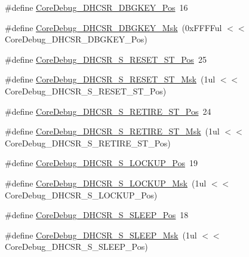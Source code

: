 \begin{DoxyCompactItemize}
\item 
\#define \hyperlink{group___c_m_s_i_s___c_m3___core_debug_gac91280edd0ce932665cf75a23d11d842}{Core\+Debug\+\_\+\+D\+H\+C\+S\+R\+\_\+\+D\+B\+G\+K\+E\+Y\+\_\+\+Pos}~16
\item 
\#define \hyperlink{group___c_m_s_i_s___c_m3___core_debug_ga1ce997cee15edaafe4aed77751816ffc}{Core\+Debug\+\_\+\+D\+H\+C\+S\+R\+\_\+\+D\+B\+G\+K\+E\+Y\+\_\+\+Msk}~(0x\+F\+F\+F\+Ful $<$$<$ Core\+Debug\+\_\+\+D\+H\+C\+S\+R\+\_\+\+D\+B\+G\+K\+E\+Y\+\_\+\+Pos)
\item 
\#define \hyperlink{group___c_m_s_i_s___c_m3___core_debug_ga6f934c5427ea057394268e541fa97753}{Core\+Debug\+\_\+\+D\+H\+C\+S\+R\+\_\+\+S\+\_\+\+R\+E\+S\+E\+T\+\_\+\+S\+T\+\_\+\+Pos}~25
\item 
\#define \hyperlink{group___c_m_s_i_s___c_m3___core_debug_gac474394bcceb31a8e09566c90b3f8922}{Core\+Debug\+\_\+\+D\+H\+C\+S\+R\+\_\+\+S\+\_\+\+R\+E\+S\+E\+T\+\_\+\+S\+T\+\_\+\+Msk}~(1ul $<$$<$ Core\+Debug\+\_\+\+D\+H\+C\+S\+R\+\_\+\+S\+\_\+\+R\+E\+S\+E\+T\+\_\+\+S\+T\+\_\+\+Pos)
\item 
\#define \hyperlink{group___c_m_s_i_s___c_m3___core_debug_ga2328118f8b3574c871a53605eb17e730}{Core\+Debug\+\_\+\+D\+H\+C\+S\+R\+\_\+\+S\+\_\+\+R\+E\+T\+I\+R\+E\+\_\+\+S\+T\+\_\+\+Pos}~24
\item 
\#define \hyperlink{group___c_m_s_i_s___c_m3___core_debug_ga89dceb5325f6bcb36a0473d65fbfcfa6}{Core\+Debug\+\_\+\+D\+H\+C\+S\+R\+\_\+\+S\+\_\+\+R\+E\+T\+I\+R\+E\+\_\+\+S\+T\+\_\+\+Msk}~(1ul $<$$<$ Core\+Debug\+\_\+\+D\+H\+C\+S\+R\+\_\+\+S\+\_\+\+R\+E\+T\+I\+R\+E\+\_\+\+S\+T\+\_\+\+Pos)
\item 
\#define \hyperlink{group___c_m_s_i_s___c_m3___core_debug_ga2900dd56a988a4ed27ad664d5642807e}{Core\+Debug\+\_\+\+D\+H\+C\+S\+R\+\_\+\+S\+\_\+\+L\+O\+C\+K\+U\+P\+\_\+\+Pos}~19
\item 
\#define \hyperlink{group___c_m_s_i_s___c_m3___core_debug_ga7b67e4506d7f464ef5dafd6219739756}{Core\+Debug\+\_\+\+D\+H\+C\+S\+R\+\_\+\+S\+\_\+\+L\+O\+C\+K\+U\+P\+\_\+\+Msk}~(1ul $<$$<$ Core\+Debug\+\_\+\+D\+H\+C\+S\+R\+\_\+\+S\+\_\+\+L\+O\+C\+K\+U\+P\+\_\+\+Pos)
\item 
\#define \hyperlink{group___c_m_s_i_s___c_m3___core_debug_ga349ccea33accc705595624c2d334fbcb}{Core\+Debug\+\_\+\+D\+H\+C\+S\+R\+\_\+\+S\+\_\+\+S\+L\+E\+E\+P\+\_\+\+Pos}~18
\item 
\#define \hyperlink{group___c_m_s_i_s___c_m3___core_debug_ga98d51538e645c2c1a422279cd85a0a25}{Core\+Debug\+\_\+\+D\+H\+C\+S\+R\+\_\+\+S\+\_\+\+S\+L\+E\+E\+P\+\_\+\+Msk}~(1ul $<$$<$ Core\+Debug\+\_\+\+D\+H\+C\+S\+R\+\_\+\+S\+\_\+\+S\+L\+E\+E\+P\+\_\+\+Pos)
$$
\end{DoxyCompactItemize}
